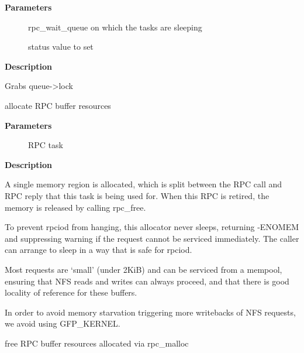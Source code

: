 \documentclass[a4paper,8pt,english]{sphinxmanual}
\begin{document}
\textbf{Parameters}
\begin{description}
\item[{}] \leavevmode
rpc\_wait\_queue on which the tasks are sleeping

\item[{}] \leavevmode
status value to set

\end{description}

\textbf{Description}

Grabs queue-\textgreater{}lock

\begin{fulllineitems}
\label{networking/kapi:c.rpc_malloc}
allocate RPC buffer resources

\end{fulllineitems}


\textbf{Parameters}
\begin{description}
\item[{}] \leavevmode
RPC task

\end{description}

\textbf{Description}

A single memory region is allocated, which is split between the
RPC call and RPC reply that this task is being used for. When
this RPC is retired, the memory is released by calling rpc\_free.

To prevent rpciod from hanging, this allocator never sleeps,
returning -ENOMEM and suppressing warning if the request cannot
be serviced immediately. The caller can arrange to sleep in a
way that is safe for rpciod.

Most requests are `small' (under 2KiB) and can be serviced from a
mempool, ensuring that NFS reads and writes can always proceed,
and that there is good locality of reference for these buffers.

In order to avoid memory starvation triggering more writebacks of
NFS requests, we avoid using GFP\_KERNEL.

\begin{fulllineitems}
\label{networking/kapi:c.rpc_free}
free RPC buffer resources allocated via rpc\_malloc

\end{fulllineitems}
\end{document}
